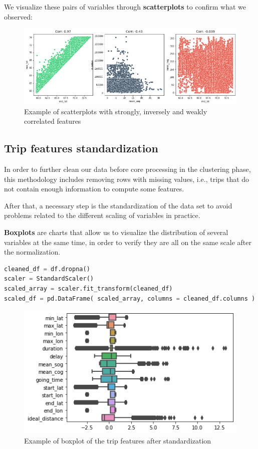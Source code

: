 We visualize these pairs of variables through \textbf{scatterplots} to confirm what we observed:

\begin{figure}[H]
    \centering
    \includegraphics[width=16cm]{Images/1/scatterplots.png}
    \caption{Example of scatterplots with strongly, inversely and weakly correlated features}
\end{figure}

\subsection{Trip features standardization}

In order to further clean our data before core processing in the clustering phase, this methodology includes removing rows with missing values, i.e., trips that do not contain enough information to compute some features.

After that, a necessary step is the standardization of the data set to avoid problems related to the different scaling of variables in practice.

\textbf{Boxplots} are charts that allow us to visualize the distribution of several variables at the same time, in order to verify they are all on the same scale after the normalization.

\begin{lstlisting}[language=Python]
cleaned_df = df.dropna()
scaler = StandardScaler()
scaled_array = scaler.fit_transform(cleaned_df)
scaled_df = pd.DataFrame( scaled_array, columns = cleaned_df.columns )
\end{lstlisting}

\begin{figure}[H]
    \centering
    \includegraphics[width=16cm]{Images/1/boxplot.png}
    \caption{Example of boxplot of the trip features after standardization}
\end{figure}



